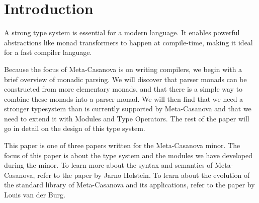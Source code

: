 \section{Introduction}
A strong type system is essential for a modern language.
It enables powerful abstractions like monad transformers to happen at compile-time,
making it ideal for a fast compiler language.

Because the focus of Meta-Casanova is on writing compilers,
we begin with a brief overview of monadic parsing.
We will discover that parser monads can be constructed from more elementary monads,
and that there is a simple way to combine these monads into a parser monad.
We will then find that we need a stronger typesystem than is currently supported by Meta-Casanova
and that we need to extend it with Modules and Type Operators.
The rest of the paper will go in detail on the design of this type system.

This paper is one of three papers written for the Meta-Casanova minor.
The focus of this paper is about the type system and the modules we have developed during the minor.
To learn more about the syntax and semantics of Meta-Casanova, refer to the paper by Jarno Holstein\cite{holstein16}.
To learn about the evolution of the standard library of Meta-Casanova and its applications, refer to the paper by Louis van der Burg\cite{vanderburg16}.
